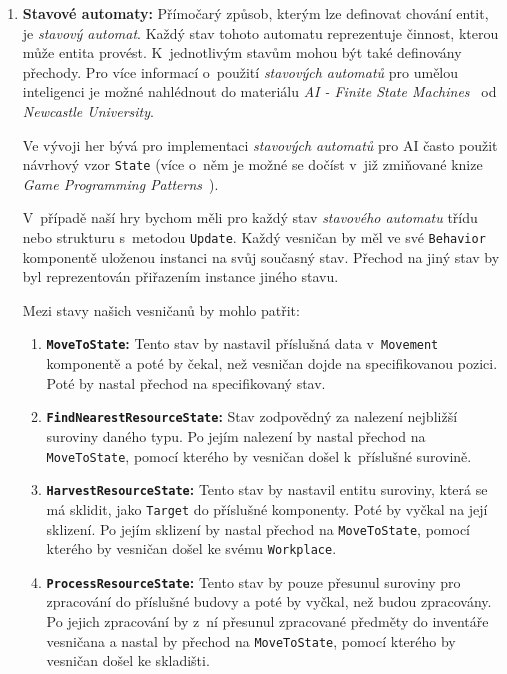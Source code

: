 \begin{enumerate}
    \item \textbf{Stavové automaty:} Přímočarý způsob, kterým lze definovat chování entit, je \textit{stavový automat}. Každý stav tohoto automatu reprezentuje činnost, kterou může entita provést. K~jednotlivým stavům mohou být také definovány přechody. Pro více informací o~použití \textit{stavových automatů} pro umělou inteligenci je možné nahlédnout do materiálu \textit{AI - Finite State Machines}~\cite{AIStateMachines} od \textit{Newcastle University}.

    Ve vývoji her bývá pro implementaci \textit{stavových automatů} pro AI často použit návrhový vzor \texttt{State} (více o~něm je možné se dočíst v~již zmiňované knize \textit{Game Programming Patterns}~\cite{nystrom2014game}).

    V~případě naší hry bychom měli pro každý stav \textit{stavového automatu} třídu nebo strukturu s~metodou \texttt{Update}. Každý vesničan by měl ve své \texttt{Behavior} komponentě uloženou instanci na svůj současný stav. Přechod na jiný stav by byl reprezentován přiřazením instance jiného stavu.

    Mezi stavy našich vesničanů by mohlo patřit:

    \newpage

    \begin{enumerate}
        \item \textbf{\texttt{MoveToState}:} Tento stav by nastavil příslušná data v~\texttt{Movement} komponentě a poté by čekal, než vesničan dojde na specifikovanou pozici. Poté by nastal přechod na specifikovaný stav.

        \item \textbf{\texttt{FindNearestResourceState}:} Stav zodpovědný za nalezení nejbližší suroviny daného typu. Po jejím nalezení by nastal přechod na \texttt{MoveToState}, pomocí kterého by vesničan došel k~příslušné surovině.

        \item \textbf{\texttt{HarvestResourceState}:} Tento stav by nastavil entitu suroviny, která se má sklidit, jako \texttt{Target} do příslušné komponenty. Poté by vyčkal na její sklizení. Po jejím sklizení by nastal přechod na \texttt{MoveToState}, pomocí kterého by vesničan došel ke svému \texttt{Workplace}.

        \item \textbf{\texttt{ProcessResourceState}:} Tento stav by pouze přesunul suroviny pro zpracování do příslušné budovy a poté by vyčkal, než budou zpracovány. Po jejich zpracování by z~ní přesunul zpracované předměty do inventáře vesničana a nastal by přechod na \texttt{MoveToState}, pomocí kterého by vesničan došel ke skladišti.


\end{enumerate}
\end{enumerate}
